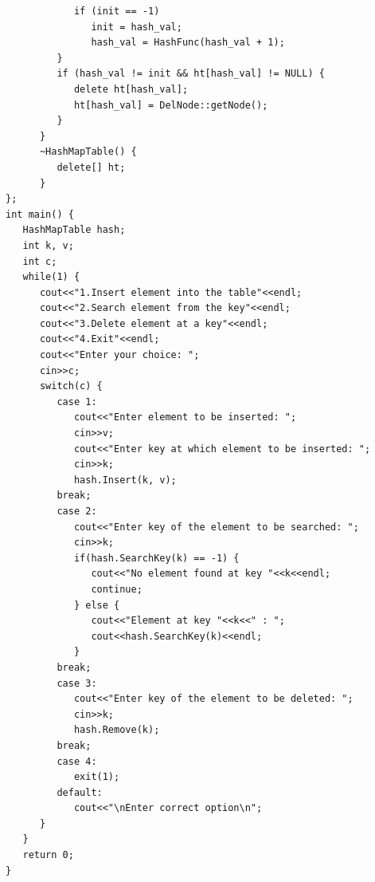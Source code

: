 \documentclass{report}
\begin{document}
\begin{verbatim}
            if (init == -1)
               init = hash_val;
               hash_val = HashFunc(hash_val + 1);
         }
         if (hash_val != init && ht[hash_val] != NULL) {
            delete ht[hash_val];
            ht[hash_val] = DelNode::getNode();
         }
      }
      ~HashMapTable() {
         delete[] ht;
      }
};
int main() {
   HashMapTable hash;
   int k, v;
   int c;
   while(1) {
      cout<<"1.Insert element into the table"<<endl;
      cout<<"2.Search element from the key"<<endl;
      cout<<"3.Delete element at a key"<<endl;
      cout<<"4.Exit"<<endl;
      cout<<"Enter your choice: ";
      cin>>c;
      switch(c) {
         case 1:
            cout<<"Enter element to be inserted: ";
            cin>>v;
            cout<<"Enter key at which element to be inserted: ";
            cin>>k;
            hash.Insert(k, v);
         break;
         case 2:
            cout<<"Enter key of the element to be searched: ";
            cin>>k;
            if(hash.SearchKey(k) == -1) {
               cout<<"No element found at key "<<k<<endl;
               continue;
            } else {
               cout<<"Element at key "<<k<<" : ";
               cout<<hash.SearchKey(k)<<endl;
            }
         break;
         case 3:
            cout<<"Enter key of the element to be deleted: ";
            cin>>k;
            hash.Remove(k);
         break;
         case 4:
            exit(1);
         default:
            cout<<"\nEnter correct option\n";
      }
   }
   return 0;
}
\end{verbatim}
\end{document}
